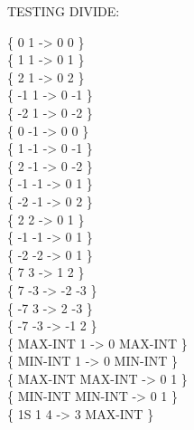 \begin{tt}
TESTING DIVIDE:     \word{/}  \word{*/} 

\{       0              1  ->  0       0 \} \\
\{       1              1  ->  0       1 \} \\
\{       2              1  ->  0       2 \} \\
\{      -1              1  ->  0      -1 \} \\
\{      -2              1  ->  0      -2 \} \\
\{       0             -1  ->  0       0 \} \\
\{       1             -1  ->  0      -1 \} \\
\{       2             -1  ->  0      -2 \} \\
\{      -1             -1  ->  0       1 \} \\
\{      -2             -1  ->  0       2 \} \\
\{       2              2  ->  0       1 \} \\
\{      -1             -1  ->  0       1 \} \\
\{      -2             -2  ->  0       1 \} \\
\{       7              3  ->  1       2 \} \\
\{       7             -3  -> -2      -3 \} \\
\{      -7              3  ->  2      -3 \} \\
\{      -7             -3  -> -1       2 \} \\
\{ MAX-INT              1  ->  0 MAX-INT \} \\
\{ MIN-INT              1  ->  0 MIN-INT \} \\
\{ MAX-INT        MAX-INT  ->  0       1 \} \\
\{ MIN-INT        MIN-INT  ->  0       1 \} \\
\{    1S 1                         4  ->  3 MAX-INT \} \\

\end{tt}
